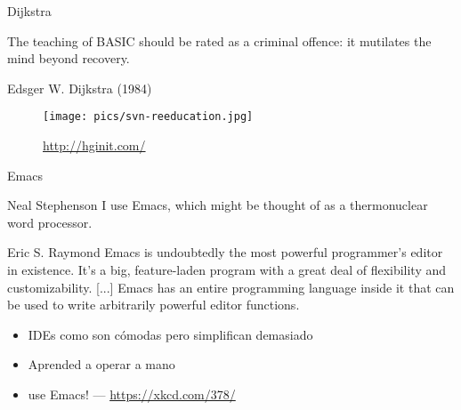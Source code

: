 \documentclass[14pt]{beamer}
\begin{document}
\begin{frame}{Dijkstra}
   \begin{block}{}\centering
   \normalsize The teaching of BASIC should be rated as
   a criminal offence: it mutilates the mind beyond recovery.
   \end{block}
  \vspace{-0.5cm}
  \begin{center} \scriptsize Edsger W. Dijkstra (1984) \end{center}

  \begin{figure}
    \centering
    \texttt{[image: pics/svn-reeducation.jpg]}
    \caption*{\url{http://hginit.com/}}
  \end{figure}
\end{frame}

\begin{frame}{Emacs}

  \begin{block}{\scriptsize Neal Stephenson} \centering
    \scriptsize I use Emacs, which might be thought of as a thermonuclear word processor.
  \end{block}

  \begin{block}{\scriptsize Eric S. Raymond} \centering
    \scriptsize Emacs is undoubtedly the most powerful programmer's editor in
    existence. It's a big, feature-laden program with a great deal of
    flexibility and customizability. [...] Emacs has an entire
    programming language inside it that can be used to write
    arbitrarily powerful editor functions.
  \end{block}

  \begin{itemize} \itemsep0em
    \item IDEs como  son cómodas pero simplifican demasiado
    \item Aprended a operar a mano 
    \item {} use Emacs! — \url{https://xkcd.com/378/}
  \end{itemize}

\end{frame}
\end{document}
